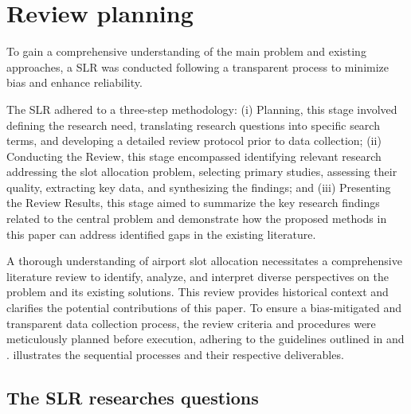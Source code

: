 \section{Review planning}
\label{sec:Review_planning}

To gain a comprehensive understanding of the main problem and existing
approaches, a \acrfull{SLR} was conducted following a transparent process to
minimize bias and enhance reliability.


The \acrshort{SLR} adhered to a three-step methodology: (i) Planning, this stage
involved defining the research need, translating research questions into
specific search terms, and developing a detailed review protocol prior to data
collection; (ii) Conducting the Review, this stage encompassed identifying
relevant research addressing the slot allocation problem, selecting primary
studies, assessing their quality, extracting key data, and synthesizing the
findings; and (iii) Presenting the Review Results, this stage aimed to summarize
the key research findings related to the central problem and demonstrate how the
proposed methods in this paper can address identified gaps in the existing
literature.


A thorough understanding of airport slot allocation necessitates a comprehensive
literature review to identify, analyze, and interpret diverse perspectives on
the problem and its existing solutions.
%
This review provides historical context and clarifies the potential
contributions of this paper.
%
To ensure a bias-mitigated and transparent data collection process, the review
criteria and procedures were meticulously planned before execution, adhering to
the guidelines outlined in  and
.
%
 illustrates the sequential processes and their respective deliverables.


%



\subsection{The \acrshort{SLR} researches questions}

